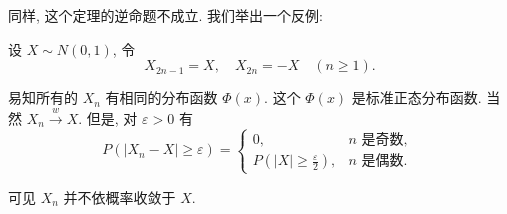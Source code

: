 同样, 这个定理的逆命题不成立. 我们举出一个反例: 

\begin{example}
    设 $X \sim N(0,1)$, 令
$$
X_{2 n-1}=X, \quad X_{2 n}=-X \quad(n \geq 1) .
$$

易知所有的 $X_n$ 有相同的分布函数 $\Phi(x)$. 这个 $\Phi(x)$ 是标准正态分布函数. 当然 $X_n \stackrel{w}{\longrightarrow} X$. 但是, 对 $\varepsilon>0$ 有
$$
P\left(\left|X_n-X\right| \geq \varepsilon\right)= \begin{cases}0, & n \text { 是奇数, } \\ P\left(|X| \geq \frac{\varepsilon}{2}\right), & n \text { 是偶数. }\end{cases}
$$

可见 $X_n$ 并不依概率收敛于 $X$.
\end{example}

